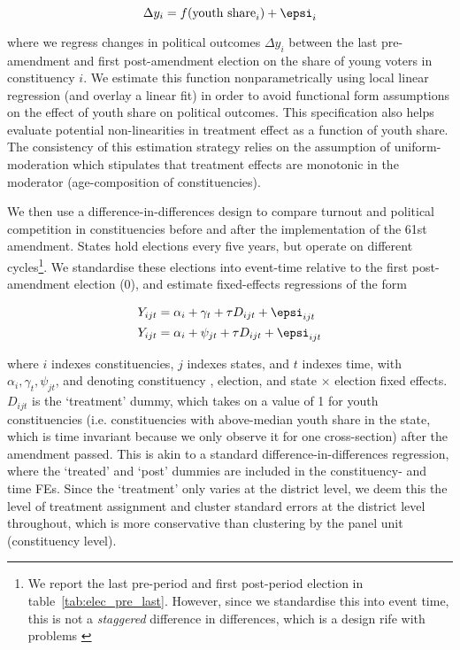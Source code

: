 $$
\Delta y_i = f( \text{youth share}_i) + \epsi_i
$$

where we regress changes in political outcomes $\Delta y_i$ between
the last pre-amendment and first post-amendment election on the share
of young voters in constituency $i$. We estimate this function
nonparametrically using local linear regression (and overlay a linear
fit) in order to avoid functional form assumptions on the effect of
youth share on political outcomes. This specification also helps
evaluate potential non-linearities in treatment effect as a function
of youth share. The consistency of this estimation strategy relies on
the assumption of uniform-moderation which stipulates that treatment
effects are monotonic in the moderator (age-composition of
constituencies).

We then use a difference-in-differences design to compare turnout and
political competition in constituencies before and after the
implementation of the 61st amendment. States hold elections every five
years, but operate on different cycles\footnote{We report the last
pre-period and first post-period election in table~\ref{tab:elec_pre_last}.
However, since we standardise this into event time, this is not a
\emph{staggered} difference in differences, which is a design rife
with problems \parencite{goodman2018difference}}. We standardise these
elections into event-time relative to the first post-amendment
election (0), and estimate fixed-effects regressions of the form

\begin{align}
Y_{ijt} & = \alpha_i + \gamma_t + \tau D_{ijt}  + \epsi_{ijt} \label{eqn:twfe} \\
Y_{ijt} & = \alpha_i + \psi_{jt} + \tau D_{ijt} + \epsi_{ijt} \label{eqn:styfe}
\end{align}

where $i$ indexes constituencies, $j$ indexes states, and $t$ indexes
time, with $\alpha_i, \gamma_t, \psi_{jt}$, and  denoting constituency
, election, and state $\times$ election fixed effects. $D_{ijt}$ is
the `treatment' dummy, which takes on a value of 1 for youth
constituencies (i.e. constituencies with above-median youth share in
the state, which is time invariant because we only observe it for one
cross-section) after the amendment passed. This is akin to a standard
difference-in-differences regression, where the `treated' and `post'
dummies are included in the constituency- and time FEs. Since the
`treatment' only varies at the district level, we deem this the level
of treatment assignment and cluster standard errors at the district
level throughout, which is more conservative than clustering by the
panel unit (constituency level).




